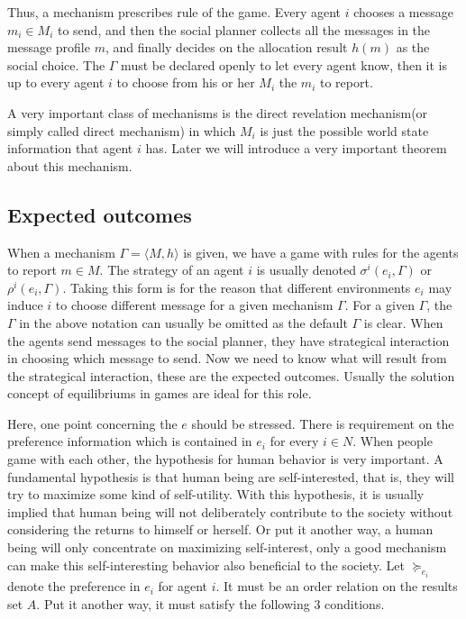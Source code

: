 Thus, a mechanism prescribes rule of the game. Every agent $i$ chooses a message
$m_i \in M_i$ to send, and then the social planner collects all the messages in the message profile $m$, and finally decides on the allocation result $h(m)$ as the social choice. The $\Gamma$ must be declared openly to let every agent know, then it is up to every agent $i$ to choose from his or her $M_i$ the $m_i$ to report.

A very important class of mechanisms is the direct revelation
mechanism(or simply called direct mechanism) in which $M_i$ is just the possible world state information 
that agent $i$ has.  Later we will introduce a very important theorem
about this mechanism.
\subsection{Expected outcomes}

When a mechanism $\Gamma=\langle M, h\rangle$ is given, we have a game
with rules for the agents to report $m \in M$. The strategy of an
agent $i$ is usually denoted $\sigma^i(e_i,\Gamma)$ or $\rho^i(e_i,\Gamma)$. Taking this
form is for the reason that different environments $e_i$ may induce
$i$ to choose different message for a given mechanism $\Gamma$. For a given $\Gamma$, the $\Gamma$ in the above notation can usually
be omitted as the default $\Gamma$ is clear.
When the agents send messages to the social planner, they have strategical interaction in choosing which message to send. Now we need to know what will result from the strategical interaction, these are the expected outcomes. Usually the solution concept of equilibriums in games are ideal for this role.

Here, one point concerning the $e$ should be stressed.  There is requirement on the preference
information which is contained in $e_i$ for every $i \in N$.
When people game with each other, the hypothesis for human behavior is
very important. A fundamental hypothesis is that human being are
self-interested, that is, they will try to maximize some kind of
self-utility. With this hypothesis, it is usually implied that human
being will not deliberately contribute to the society without
considering the returns to himself or herself. Or put it another way,
a human being will only concentrate on maximizing self-interest, only
a good mechanism can make this self-interesting behavior also
beneficial to the society. Let $\succeq_{e_i}$ denote the preference
in $e_i$ for agent $i$. It must be an order relation on the results
set $A$. Put it another way, it must satisfy the following 3
conditions.

